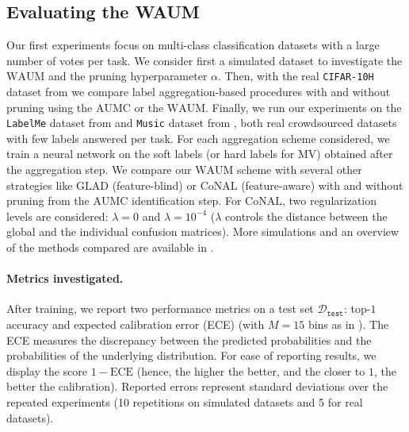\subsection{Evaluating the WAUM}
\label{subsec:evaluate}

Our first experiments focus on multi-class classification datasets with a large number of votes per task.
We consider first a simulated dataset to investigate the $\mathrm{WAUM}$ and the pruning hyperparameter $\alpha$.
Then, with the real \texttt{CIFAR-10H} dataset from \citet{peterson_human_2019} we compare label aggregation-based procedures with and without pruning using the $\mathrm{AUMC}$ or the $\mathrm{WAUM}$.
Finally, we run our experiments on the \texttt{LabelMe} dataset from \citet{rodrigues2018deep} and \texttt{Music} dataset from \citet{rodrigues2014gaussian}, both real crowdsourced datasets with few labels answered per task.
For each aggregation scheme considered, we train a neural network on the soft labels (or hard labels for MV) obtained after the aggregation step.
We compare our $\mathrm{WAUM}$ scheme with several other strategies like $\mathrm{GLAD}$ (feature-blind) or $\mathrm{CoNAL}$ (feature-aware) with and without pruning from the $\mathrm{AUMC}$ identification step.
For $\mathrm{CoNAL}$, two regularization levels are considered: $\lambda=0$ and $\lambda=10^{-4}$ ($\lambda$ controls the distance between the global and the individual confusion matrices).
More simulations and an overview of the methods compared are available in .

\paragraph*{Metrics investigated.}
After training, we report two performance metrics on a test set $\mathcal{D}_{\texttt{test}}$: top-$1$ accuracy and expected calibration error (ECE) (with $M=15$ bins as in \citet{guo_calibration_2017}).
The ECE measures the discrepancy between the predicted probabilities and the probabilities of the underlying distribution.
For ease of reporting results, we display the score $1-\mathrm{ECE}$ (hence, the higher the better, and the closer to $1$, the better the calibration).
Reported errors represent standard deviations over the repeated experiments (10 repetitions on simulated datasets and 5 for real datasets).

